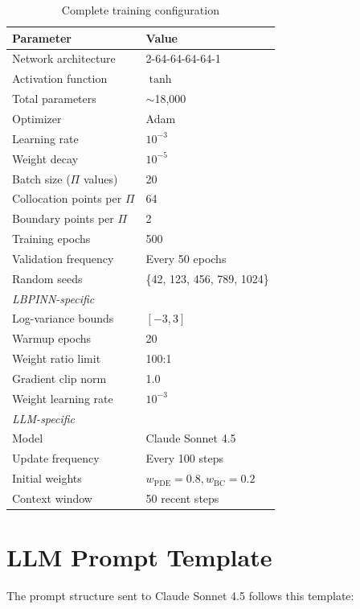 \documentclass{article}
\begin{document}
\begin{table}[H]
\centering
\caption{Complete training configuration}
\begin{tabular}{ll}
\toprule
\textbf{Parameter} & \textbf{Value} \\
\midrule
Network architecture & 2-64-64-64-64-1 \\
Activation function & $\tanh$ \\
Total parameters & $\sim$18,000 \\
Optimizer & Adam \\
Learning rate & $10^{-3}$ \\
Weight decay & $10^{-5}$ \\
Batch size ($\Pi$ values) & 20 \\
Collocation points per $\Pi$ & 64 \\
Boundary points per $\Pi$ & 2 \\
Training epochs & 500 \\
Validation frequency & Every 50 epochs \\
Random seeds & \{42, 123, 456, 789, 1024\} \\
\midrule
\multicolumn{2}{l}{\textit{LBPINN-specific}} \\
Log-variance bounds & $[-3, 3]$ \\
Warmup epochs & 20 \\
Weight ratio limit & 100:1 \\
Gradient clip norm & 1.0 \\
Weight learning rate & $10^{-3}$ \\
\midrule
\multicolumn{2}{l}{\textit{LLM-specific}} \\
Model & Claude Sonnet 4.5 \\
Update frequency & Every 100 steps \\
Initial weights & $w_{\text{PDE}}=0.8, w_{\text{BC}}=0.2$ \\
Context window & 50 recent steps \\
\bottomrule
\end{tabular}
\end{table}

\section{LLM Prompt Template}
\label{app:prompt}

The prompt structure sent to Claude Sonnet 4.5 follows this template:
\end{document}

